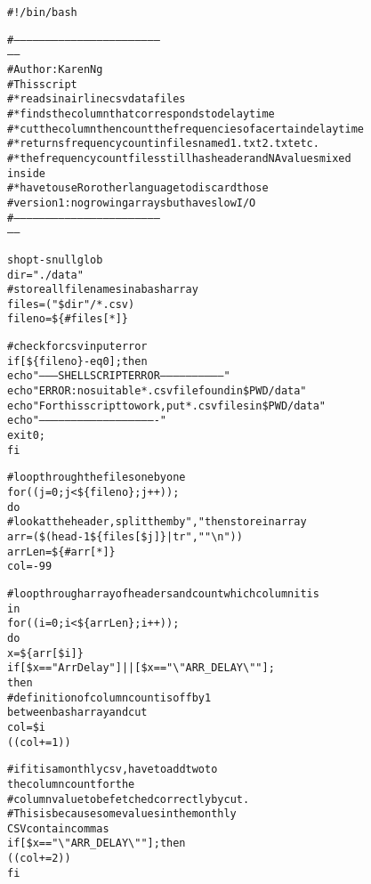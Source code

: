 \documentclass[letterpaper,10pt,english]{/usr/local/lib/python2.7/dist-packages/sphinx/texinputs/sphinxhowto}
\newenvironment{InvisibleVerbatim}
        {\begin{mdframed}[leftmargin=0.1\linewidth,innerleftmargin=3pt,innerrightmargin=3pt, userdefinedwidth=1\linewidth, linewidth=0pt, linecolor=white, usetwoside=false]}
        {\end{mdframed}}
\begin{document}
                \begin{InvisibleVerbatim}
                \vspace{-0.5\baselineskip}
\begin{alltt}\#!/bin/bash

\#---------------------------------------------------------------------
------
\# Author: Karen Ng
\# This script
\# * reads in airline csv data files
\# * finds the column that corresponds to delay time
\# * cut the column then count the frequencies of a certain delay time
\# * returns frequency count in files named 1.txt 2.txt etc.
\# * the frequency count files still has header and NA values mixed
inside
\# * have to use R or other language to discard those
\# version 1: no growing arrays but have slow I/O
\#---------------------------------------------------------------------
------

shopt -s nullglob
dir="./data"
\# store all file names in a bash array
files=( "\$dir"/*.csv )
fileno=\$\{\#files[*]\}

\# check for csv input error
if [ \$\{fileno\} -eq 0 ]; then
        echo "--------SHELL SCRIPT ERROR-----------------------------"
        echo "ERROR: no suitable *.csv file found in \$PWD/data"
        echo "For this script to work, put *.csv files in \$PWD/data"
        echo "-------------------------------------------------------"
        exit 0;
fi

\# loop through the files one by one
for ((j=0; j < \$\{fileno\}; j++));
do
        \# look at the header, split them by "," then store in array
        arr=(\$(head -1 \$\{files[\$j]\} | tr "," "\textbackslash{}n"))
        arrLen=\$\{\#arr[*]\}
        col=-99

        \# loop through array of headers and count which column it is
in
        for ((i=0; i < \$\{arrLen\}; i++));
        do
                x=\$\{arr[\$i]\}
                if [ \$x == "ArrDelay" ] || [ \$x == "\textbackslash{}"ARR\_DELAY\textbackslash{}"" ];
then
                        \# definition of column count is off by 1
between bash array and cut
                        col=\$i
                        (( col += 1 ))

                        \# if it is a monthly csv, have to add two to
the column count for the
                        \# column value to be fetched correctly by cut.
                        \# This is because some values in the monthly
CSV contain commas
                        if [ \$x == "\textbackslash{}"ARR\_DELAY\textbackslash{}"" ]; then
                                (( col += 2 ))
                        fi


\end{alltt}
\end{InvisibleVerbatim}
\end{document}
